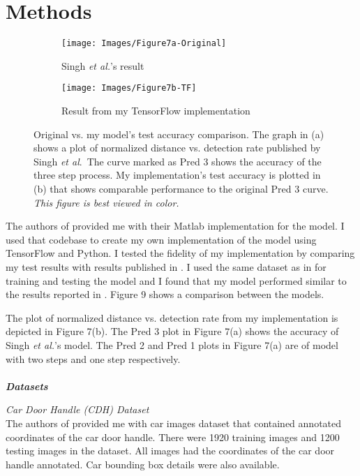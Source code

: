 \documentclass [11pt,letterpaper ,twoside ,openany ]{report}
\begin{document}
    \chapter{Methods}
    \doublespacing

    \begin{wrapfigure}{l}[9mm]{0.55\textwidth}
        \centering
        \begin{subfigure}[b]{\linewidth}
            \texttt{[image: Images/Figure7a-Original]}
            \caption{Singh \textit{et al.}'s result \cite{Singh_2016_CVPR}}
        \end{subfigure}
        \begin{subfigure}[b]{\linewidth}
            \texttt{[image: Images/Figure7b-TF]}
            \caption{Result from my TensorFlow implementation}
        \end{subfigure}
        \caption{Original vs. my model's test accuracy comparison. The graph in (a) shows a plot of normalized distance vs. detection rate published by Singh \textit{et al}.\ The curve marked as Pred 3 shows the accuracy of the three step process. My implementation's test accuracy is plotted in (b) that shows comparable performance to the original Pred 3 curve. \textit{This figure is best viewed in color.}}
        \label{fig:compare.}
    \end{wrapfigure}       


    The authors of \cite{Singh_2016_CVPR} provided me with their Matlab implementation for the model. I used that codebase to create my own implementation of the model using TensorFlow and Python. I tested the fidelity of my implementation by comparing my test results with results published in \cite{Singh_2016_CVPR}. I used the same dataset as in \cite{Singh_2016_CVPR} for training and testing the model and I found that my model performed similar to the results reported in \cite{Singh_2016_CVPR}. Figure 9 shows a comparison between the models.

    The plot of normalized distance vs. detection rate from my implementation is depicted in Figure 7(b). The Pred 3 plot in Figure 7(a) shows the accuracy of Singh \textit{et al.}'s model. The Pred 2 and Pred 1 plots in Figure 7(a) are of model with two steps and one step respectively.\\\\

    \noindent
    \textbf{\textit{Datasets}}

    \noindent
    \textit{Car Door Handle (CDH) Dataset}\\
    The authors of \cite{Singh_2016_CVPR} provided me with car images dataset that contained annotated coordinates of the car door handle. There were 1920 training images and 1200 testing images in the dataset. All images had the coordinates of the car door handle annotated. Car bounding box details were also available.\\
\end{document}
